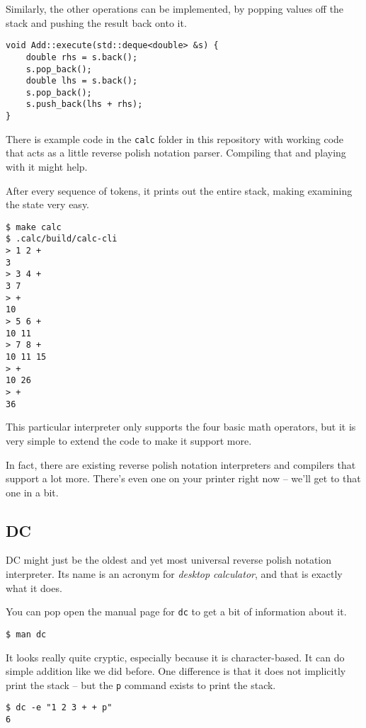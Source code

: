 \documentclass[a4paper,twocolumn]{article}
\begin{document}
Similarly, the other operations can be implemented, by popping values off the stack and pushing the result back onto it.

\begin{verbatim}
void Add::execute(std::deque<double> &s) {
    double rhs = s.back();
    s.pop_back();
    double lhs = s.back();
    s.pop_back();
    s.push_back(lhs + rhs);
}  
\end{verbatim}

There is example code in the \verb|calc| folder in this repository with working code that acts as a little reverse polish notation parser. Compiling that and playing with it might help.

After every sequence of tokens, it prints out the entire stack, making examining the state very easy.

\begin{verbatim}
$ make calc
$ .calc/build/calc-cli
> 1 2 +
3
> 3 4 +
3 7
> +
10
> 5 6 +
10 11
> 7 8 +
10 11 15
> +
10 26
> +
36
\end{verbatim}

This particular interpreter only supports the four basic math operators, but it is very simple to extend the code to make it support more.

In fact, there are existing reverse polish notation interpreters and compilers that support a lot more. There's even one on your printer right now -- we'll get to that one in a bit.

\subsection{DC}

DC might just be the oldest and yet most universal reverse polish notation interpreter. Its name is an acronym for \emph{desktop calculator}, and that is exactly what it does.

You can pop open the manual page for \verb|dc| to get a bit of information about it.

\begin{verbatim}
$ man dc
\end{verbatim}

It looks really quite cryptic, especially because it is character-based. It can do simple addition like we did before. One difference is that it does not implicitly print the stack -- but the \verb|p| command exists to print the stack.

\begin{verbatim}
$ dc -e "1 2 3 + + p"
6
\end{verbatim}
\end{document}
